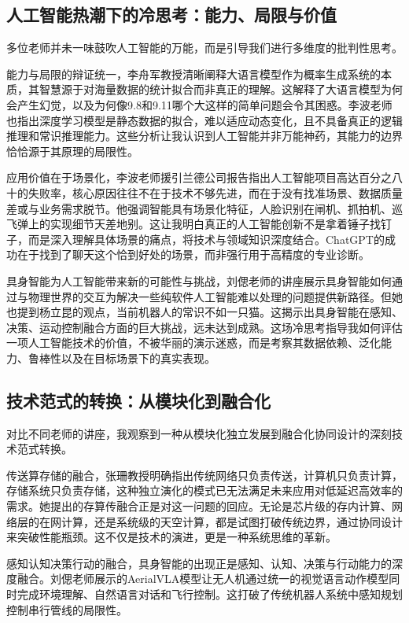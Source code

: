 \documentclass[zihao=-4, linespread=1.5]{ctexart}
\begin{document}
\subsection{人工智能热潮下的冷思考：能力、局限与价值}

多位老师并未一味鼓吹人工智能的万能，而是引导我们进行多维度的批判性思考。

能力与局限的辩证统一，李舟军教授清晰阐释大语言模型作为概率生成系统的本质，其智慧源于对海量数据的统计拟合而非真正的理解。这解释了大语言模型为何会产生幻觉，以及为何像9.8和9.11哪个大这样的简单问题会令其困惑。李波老师也指出深度学习模型是静态数据的拟合，难以适应动态变化，且不具备真正的逻辑推理和常识推理能力。这些分析让我认识到人工智能并非万能神药，其能力的边界恰恰源于其原理的局限性。

应用价值在于场景化，李波老师援引兰德公司报告指出人工智能项目高达百分之八十的失败率，核心原因往往不在于技术不够先进，而在于没有找准场景、数据质量差或与业务需求脱节。他强调智能具有场景化特征，人脸识别在闸机、抓拍机、巡飞弹上的实现细节天差地别。这让我明白真正的人工智能创新不是拿着锤子找钉子，而是深入理解具体场景的痛点，将技术与领域知识深度结合。ChatGPT的成功在于找到了聊天这个恰到好处的场景，而非强行用于高精度的专业诊断。

具身智能为人工智能带来新的可能性与挑战，刘偲老师的讲座展示具身智能如何通过与物理世界的交互为解决一些纯软件人工智能难以处理的问题提供新路径。但她也提到杨立昆的观点，当前机器人的常识不如一只猫。这揭示出具身智能在感知、决策、运动控制融合方面的巨大挑战，远未达到成熟。这场冷思考指导我如何评估一项人工智能技术的价值，不被华丽的演示迷惑，而是考察其数据依赖、泛化能力、鲁棒性以及在目标场景下的真实表现。

\subsection{技术范式的转换：从模块化到融合化}

对比不同老师的讲座，我观察到一种从模块化独立发展到融合化协同设计的深刻技术范式转换。

传送算存储的融合，张珊教授明确指出传统网络只负责传送，计算机只负责计算，存储系统只负责存储，这种独立演化的模式已无法满足未来应用对低延迟高效率的需求。她提出的存算传融合正是对这一问题的回应。无论是芯片级的存内计算、网络层的在网计算，还是系统级的天空计算，都是试图打破传统边界，通过协同设计来突破性能瓶颈。这不仅是技术的演进，更是一种系统思维的革新。

感知认知决策行动的融合，具身智能的出现正是感知、认知、决策与行动能力的深度融合。刘偲老师展示的AerialVLA模型让无人机通过统一的视觉语言动作模型同时完成环境理解、自然语言对话和飞行控制。这打破了传统机器人系统中感知规划控制串行管线的局限性。
\end{document}
